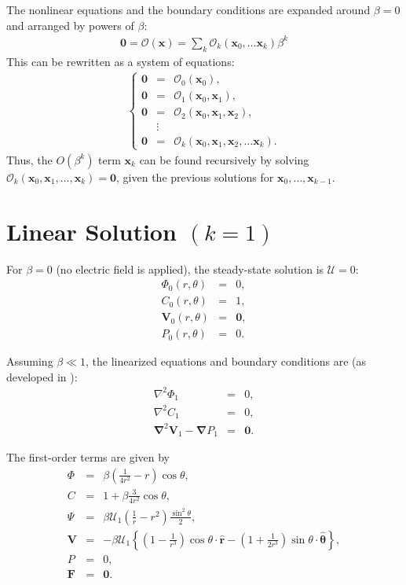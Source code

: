 \documentclass[final]{elsarticle}
\newcommand{\brc}[2]{\left\{\begin{array}{#1}#2\end{array}\right.}
\newcommand{\pars}[1]{\left(#1\right)}
\newcommand{\brcs}[1]{\left\{#1\right\}}
\newcommand\Laplacian{\nabla^2}
\newcommand\bnabla{\boldsymbol{\nabla}}
\newcommand\bLaplacian{\boldsymbol{\nabla}^2}
\newcommand\bV{\boldsymbol{V}}
\newcommand\bF{\boldsymbol{F}}
\newcommand\bx{\boldsymbol{x}}
\newcommand\br{\boldsymbol{r}}
\newcommand\brhat{\hat{\br}}
\newcommand\btheta{\boldsymbol{\theta}}
\newcommand\bthetahat{\hat{\btheta}}
\newcommand\bzero{\boldsymbol{0}}
\newcommand\cO{\mathcal{O}}
\newcommand\cU{\mathscr{U}}
\begin{document}
\begin{appendix}
The nonlinear equations and the boundary conditions are expanded around $\beta = 0$
and arranged by powers of $\beta$:
\begin{eqnarray*}
\bzero = \cO(\bx) = \sum_k \cO_k(\bx_0, \ldots \bx_k) \beta^k
\end{eqnarray*}
This can be rewritten as a system of equations:
\begin{eqnarray*}
\brc{rcl}{
\bzero &=& \cO_0(\bx_0), \\
\bzero &=& \cO_1(\bx_0, \bx_1), \\
\bzero &=& \cO_2(\bx_0, \bx_1, \bx_2), \\
& \vdots & \\
\bzero &=& \cO_k(\bx_0, \bx_1, \bx_2, \ldots \bx_k).
}
\end{eqnarray*}
Thus, the $O(\beta^k)$ term $\bx_k$ can be found recursively by solving 
$\cO_k(\bx_0, \bx_1, \ldots, \bx_k) = \bzero$,
given the previous solutions for $\bx_0, \ldots, \bx_{k-1}$.

\section{Linear Solution $(k=1)$} \label{app:linear}

For $\beta = 0$ (no electric field is applied), the steady-state solution is $\cU = 0$:
\begin{eqnarray*}
\varPhi_0(r,\theta) &=& 0, \\
C_0(r,\theta) &=& 1, \\
\bV_0(r,\theta) &=& \bzero, \\
P_0(r,\theta) &=& 0.
\end{eqnarray*}

Assuming $\beta \ll 1$, the linearized equations and boundary conditions are 
(as developed in \cite{yariv2010migration}):
\begin{eqnarray*}
\Laplacian \varPhi_1 &=& 0, \\
\Laplacian C_1 &=& 0, \\
\bLaplacian \bV_1 - \bnabla P_1 &=& \bzero.
\end{eqnarray*}

The first-order terms are given by
\begin{eqnarray*}
\varPhi &=& \beta \pars{\frac{1}{4r^2} - r}\cos\theta, \\
C &=& 1 + \beta \frac{3}{4r^2} \cos\theta, \\
\Psi &=& \beta \cU_1 \pars{\frac{1}{r} - r^2} \frac{\sin^2\theta}{2}, \\
\bV &=& -\beta \cU_1 \brcs{\pars{1 - \frac{1}{r^3}}\cos\theta \cdot \brhat - 
                               \pars{1 + \frac{1}{2r^3}} \sin\theta \cdot \bthetahat}, \\
P &=& 0, \\
\bF &=& \bzero.
\end{eqnarray*}


\end{appendix}
\end{document}
